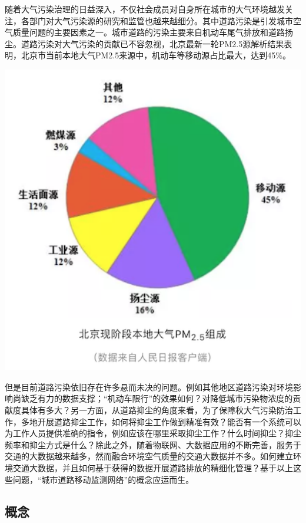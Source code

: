 \documentclass[]{book}
\begin{document}
随着大气污染治理的日益深入，不仅社会成员对自身所在城市的大气环境越发关注，各部门对大气污染源的研究和监管也越来越细分。其中道路污染是引发城市空气质量问题的主要因素之一。城市道路的污染主要来自机动车尾气排放和道路扬尘。道路污染对大气污染的贡献已不容忽视，北京最新一轮PM2.5源解析结果表明，北京市当前本地大气PM2.5来源中，机动车等移动源占比最大，达到45\%。

\includegraphics[width=5.56in]{images/dlyd1}

但是目前道路污染依旧存在许多悬而未决的问题。例如其他地区道路污染对环境影响尚缺乏有力的数据支撑；``机动车限行''的效果如何？对降低城市污染物浓度的贡献度具体有多大？另一方面，从道路抑尘的角度来看，为了保障秋大气污染防治工作，多地开展道路抑尘工作，如何将抑尘工作做到精准有效？能否有一个系统可以为工作人员提供准确的指令，例如应该在哪里采取抑尘工作？什么时间抑尘？抑尘频率和抑尘方式是什么？除此之外，随着物联网、大数据应用的不断完善，服务于交通的大数据越来越多，然而融合环境空气质量的交通大数据并不多。如何建立环境交通大数据，并且如何基于获得的数据开展道路排放的精细化管理？基于以上这些问题，``城市道路移动监测网络''的概念应运而生。

\hypertarget{ux6982ux5ff5}{%
\subsection{概念}\label{ux6982ux5ff5}}
\end{document}

